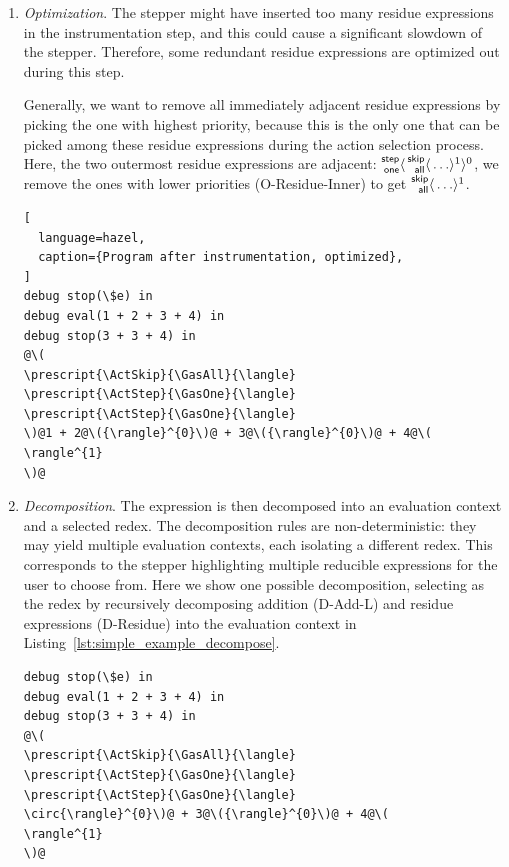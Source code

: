 \begin{enumerate}
\item \emph{Optimization}. The stepper might have inserted too many
  residue expressions in the instrumentation step, and this could
  cause a significant slowdown of the stepper. Therefore,
  some redundant residue expressions are optimized out during this
  step.

  Generally, we want to remove all immediately adjacent residue
  expressions by picking the one with highest priority, because this is
  the only one that can be picked among these residue expressions
  during the action selection process. Here, the two outermost
  residue expressions are adjacent:
  \(\Residue{\ActStep}{\GasOne}{0}{\Residue{\ActSkip}{\GasAll}{1}{\ldots}}\),
  we remove the ones with lower priorities (O-Residue-Inner) to get
  \(\Residue{\ActSkip}{\GasAll}{1}{\ldots}\).

\begin{lstlisting}[
  language=hazel,
  caption={Program after instrumentation, optimized},
]
debug stop(\$e) in
debug eval(1 + 2 + 3 + 4) in
debug stop(3 + 3 + 4) in
@\(
\prescript{\ActSkip}{\GasAll}{\langle}
\prescript{\ActStep}{\GasOne}{\langle}
\prescript{\ActStep}{\GasOne}{\langle}
\)@1 + 2@\({\rangle}^{0}\)@ + 3@\({\rangle}^{0}\)@ + 4@\(
\rangle^{1}
\)@\end{lstlisting}

\item \emph{Decomposition}. \label{num:simple_example_decompose} The
  expression is then decomposed into an evaluation context and a
  selected redex. The decomposition rules are non-deterministic: they
  may yield multiple evaluation contexts, each isolating a different
  redex. This corresponds to the stepper highlighting multiple
  reducible expressions for the user to choose from. Here we show one
  possible decomposition, selecting  as the redex by
  recursively decomposing addition (D-Add-L) and residue expressions
  (D-Residue) into the evaluation context in
  Listing~\ref{lst:simple_example_decompose}.

  \begin{lstlisting}[language=hazel,caption={Decomposed evaluation context},label={lst:simple_example_decompose}]
debug stop(\$e) in
debug eval(1 + 2 + 3 + 4) in
debug stop(3 + 3 + 4) in
@\(
\prescript{\ActSkip}{\GasAll}{\langle}
\prescript{\ActStep}{\GasOne}{\langle}
\prescript{\ActStep}{\GasOne}{\langle}
\circ{\rangle}^{0}\)@ + 3@\({\rangle}^{0}\)@ + 4@\(
\rangle^{1}
\)@\end{lstlisting}


\end{enumerate}
